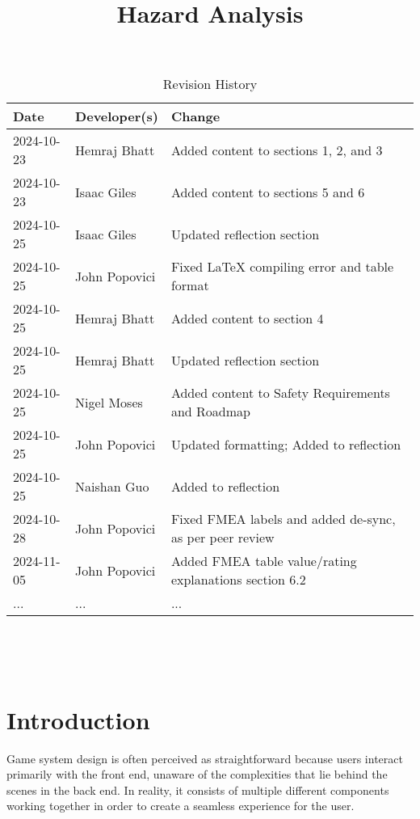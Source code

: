 \documentclass{article}
\title{Hazard Analysis\\\progname}
\author{\authname}
\date{}
\begin{document}
\maketitle
\thispagestyle{empty}



\begin{table}[hp]
\caption{Revision History} \label{TblRevisionHistory}
\begin{tabularx}{\textwidth}{llX}
\toprule
\textbf{Date} & \textbf{Developer(s)} & \textbf{Change}\\
\midrule
2024-10-23 & Hemraj Bhatt & Added content to sections 1, 2, and 3\\
2024-10-23 & Isaac Giles & Added content to sections 5 and 6 \\
2024-10-25 & Isaac Giles & Updated reflection section \\
2024-10-25 & John Popovici & Fixed LaTeX compiling error and table format \\
2024-10-25 & Hemraj Bhatt & Added content to section 4\\
2024-10-25 & Hemraj Bhatt & Updated reflection section\\
2024-10-25 & Nigel Moses & Added content to Safety Requirements and Roadmap\\
2024-10-25 & John Popovici & Updated formatting; Added to reflection \\
2024-10-25 & Naishan Guo &  Added to reflection \\
2024-10-28 & John Popovici & Fixed FMEA labels and added de-sync, as per peer review \\
2024-11-05 & John Popovici & Added FMEA table value/rating explanations section 6.2\\
... & ... & ...\\
\bottomrule
\end{tabularx}
\end{table}

~\newpage

\tableofcontents

~\newpage



\section{Introduction}

Game system design is often perceived as straightforward because users interact primarily with the front end, unaware of the complexities that lie behind the scenes in the back end. In reality, it consists of multiple different components working together in order to create a seamless experience for the user.\\
\end{document}
